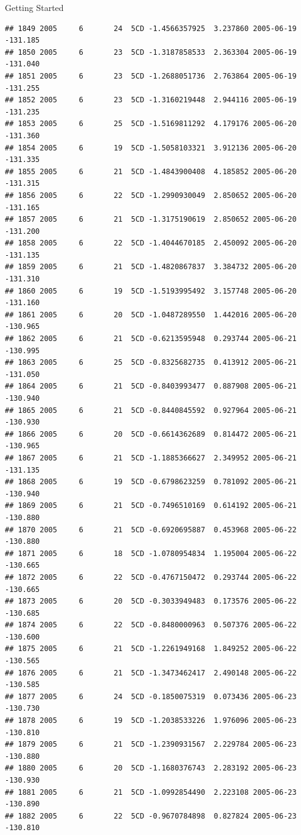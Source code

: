 \documentclass[
  ignorenonframetext,
]{beamer}
\begin{document}
\begin{frame}[fragile]{Getting Started}
\begin{verbatim}
## 1849 2005     6       24  5CD -1.4566357925  3.237860 2005-06-19 -131.185
## 1850 2005     6       23  5CD -1.3187858533  2.363304 2005-06-19 -131.040
## 1851 2005     6       23  5CD -1.2688051736  2.763864 2005-06-19 -131.255
## 1852 2005     6       23  5CD -1.3160219448  2.944116 2005-06-19 -131.235
## 1853 2005     6       25  5CD -1.5169811292  4.179176 2005-06-20 -131.360
## 1854 2005     6       19  5CD -1.5058103321  3.912136 2005-06-20 -131.335
## 1855 2005     6       21  5CD -1.4843900408  4.185852 2005-06-20 -131.315
## 1856 2005     6       22  5CD -1.2990930049  2.850652 2005-06-20 -131.165
## 1857 2005     6       21  5CD -1.3175190619  2.850652 2005-06-20 -131.200
## 1858 2005     6       22  5CD -1.4044670185  2.450092 2005-06-20 -131.135
## 1859 2005     6       21  5CD -1.4820867837  3.384732 2005-06-20 -131.310
## 1860 2005     6       19  5CD -1.5193995492  3.157748 2005-06-20 -131.160
## 1861 2005     6       20  5CD -1.0487289550  1.442016 2005-06-20 -130.965
## 1862 2005     6       21  5CD -0.6213595948  0.293744 2005-06-21 -130.995
## 1863 2005     6       25  5CD -0.8325682735  0.413912 2005-06-21 -131.050
## 1864 2005     6       21  5CD -0.8403993477  0.887908 2005-06-21 -130.940
## 1865 2005     6       21  5CD -0.8440845592  0.927964 2005-06-21 -130.930
## 1866 2005     6       20  5CD -0.6614362689  0.814472 2005-06-21 -130.965
## 1867 2005     6       21  5CD -1.1885366627  2.349952 2005-06-21 -131.135
## 1868 2005     6       19  5CD -0.6798623259  0.781092 2005-06-21 -130.940
## 1869 2005     6       21  5CD -0.7496510169  0.614192 2005-06-21 -130.880
## 1870 2005     6       21  5CD -0.6920695887  0.453968 2005-06-22 -130.880
## 1871 2005     6       18  5CD -1.0780954834  1.195004 2005-06-22 -130.665
## 1872 2005     6       22  5CD -0.4767150472  0.293744 2005-06-22 -130.665
## 1873 2005     6       20  5CD -0.3033949483  0.173576 2005-06-22 -130.685
## 1874 2005     6       22  5CD -0.8480000963  0.507376 2005-06-22 -130.600
## 1875 2005     6       21  5CD -1.2261949168  1.849252 2005-06-22 -130.565
## 1876 2005     6       21  5CD -1.3473462417  2.490148 2005-06-22 -130.585
## 1877 2005     6       24  5CD -0.1850075319  0.073436 2005-06-23 -130.730
## 1878 2005     6       19  5CD -1.2038533226  1.976096 2005-06-23 -130.810
## 1879 2005     6       21  5CD -1.2390931567  2.229784 2005-06-23 -130.880
## 1880 2005     6       20  5CD -1.1680376743  2.283192 2005-06-23 -130.930
## 1881 2005     6       21  5CD -1.0992854490  2.223108 2005-06-23 -130.890
## 1882 2005     6       22  5CD -0.9670784898  0.827824 2005-06-23 -130.810

\end{verbatim}
\end{frame}
\end{document}
